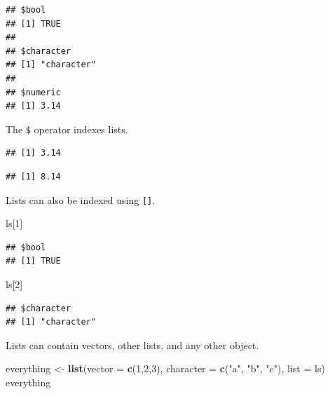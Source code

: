 \documentclass[]{book}
\newenvironment{Shaded}{\begin{snugshade}}{\end{snugshade}}
\newcommand{\DataTypeTok}[1]{\textcolor[rgb]{0.13,0.29,0.53}{#1}}
\newcommand{\DecValTok}[1]{\textcolor[rgb]{0.00,0.00,0.81}{#1}}
\newcommand{\KeywordTok}[1]{\textcolor[rgb]{0.13,0.29,0.53}{\textbf{#1}}}
\newcommand{\NormalTok}[1]{#1}
\newcommand{\OperatorTok}[1]{\textcolor[rgb]{0.81,0.36,0.00}{\textbf{#1}}}
\newcommand{\StringTok}[1]{\textcolor[rgb]{0.31,0.60,0.02}{#1}}
\begin{document}
\begin{verbatim}
## $bool
## [1] TRUE
## 
## $character
## [1] "character"
## 
## $numeric
## [1] 3.14
\end{verbatim}

The \texttt{\$} operator indexes lists.

\begin{Shaded}
\end{Shaded}

\begin{verbatim}
## [1] 3.14
\end{verbatim}

\begin{Shaded}
\end{Shaded}

\begin{verbatim}
## [1] 8.14
\end{verbatim}

Lists can also be indexed using \texttt{{[}{]}}.

\begin{Shaded}
\begin{Highlighting}[]
\NormalTok{ls[}\DecValTok{1}\NormalTok{]}
\end{Highlighting}
\end{Shaded}

\begin{verbatim}
## $bool
## [1] TRUE
\end{verbatim}

\begin{Shaded}
\begin{Highlighting}[]
\NormalTok{ls[}\DecValTok{2}\NormalTok{]}
\end{Highlighting}
\end{Shaded}

\begin{verbatim}
## $character
## [1] "character"
\end{verbatim}

Lists can contain vectors, other lists, and any other object.

\begin{Shaded}
\begin{Highlighting}[]
\NormalTok{everything <-}\StringTok{ }\KeywordTok{list}\NormalTok{(}\DataTypeTok{vector =} \KeywordTok{c}\NormalTok{(}\DecValTok{1}\NormalTok{,}\DecValTok{2}\NormalTok{,}\DecValTok{3}\NormalTok{), }\DataTypeTok{character =} \KeywordTok{c}\NormalTok{(}\StringTok{"a"}\NormalTok{, }\StringTok{"b"}\NormalTok{, }\StringTok{"c"}\NormalTok{), }\DataTypeTok{list =}\NormalTok{ ls)}
\NormalTok{everything}
\end{Highlighting}
\end{Shaded}
\end{document}
